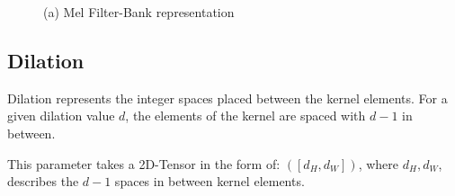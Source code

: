 \begin{figure}[H]
    \centering
    \caption{(a) Mel Filter-Bank representation}
\end{figure}

\subsection*{Dilation}
Dilation represents the integer spaces placed between the kernel elements.
For a given dilation value \(d\),
the elements of the kernel are spaced with \(d - 1\) in between.

This parameter takes a 2D-Tensor in the form of:
\( \left( \left[ d_{H}, d_{W} \right] \right) \),
where \( d_{H}, d_{W} \),
describes the \(d - 1 \) spaces in between kernel elements. 

